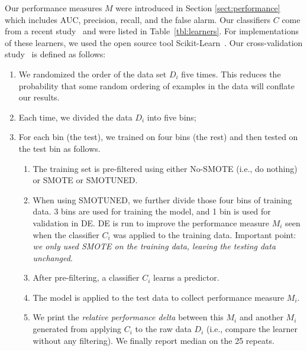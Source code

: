 \documentclass[sigconf]{acmart}
\newcommand{\be}{\begin{enumerate}[leftmargin=0.4cm]}
\newcommand{\ee}{\end{enumerate}}
\theoremstyle{break}
\newcommand{\tion}[1]{{Section }\ref{sect:#1}}
\newcommand{\sma}{{\sc SMOTE}}
\newcommand{\smb}{{\sc SMOTUNED}}
\begin{document}
Our performance measures $M$ were introduced in \tion{performance}
which includes   AUC, precision, recall, and the  false alarm. 
Our classifiers
 $C$  come from a  recent study~\cite{ghotra2015revisiting}
and were listed in  Table~\ref{tbl:learners}.
For  implementations 
of these learners,
we used  the open source tool
Scikit-Learn~\cite{pedregosa2011scikit}.
Our  cross-validation study~\cite{refaeilzadeh2009cross} is defined as follows:
\be
\item We randomized the order of the data set $D_i$  five times. This reduces the probability
that some random ordering of examples in the data will conflate our results.
\item Each time, we divided the data $D_i$ into five bins;
\item For each bin (the test), we trained on four bins (the rest) and then tested
on the test bin as follows.
\be
\item
The  training set is pre-filtered using either No-SMOTE (i.e., do nothing) or  {\sma} or {\smb}.  
\item
When using {\smb}, we further divide those four bins of training data. 3 bins are used for training the model, and 1 bin is used for validation in DE. DE is  run to  improve
the performance measure $M_i$ seen when the classifier $C_i$ was applied to the training data.
Important point: {\em we only used {\sma} on the training data,  leaving
the  testing data unchanged}.
\item
After pre-filtering, a classifier $C_i$  learns a predictor.
\item
The model is applied to the test data to collect performance measure $M_i$. 
\item 
We print the {\em relative performance delta} between this $M_i$ and another  $M_i$
generated from applying $C_i$ to the raw data $D_i$ (i.e., compare the learner
without any filtering). We finally report median on the 25 repeats.
\ee
\ee
\end{document}
